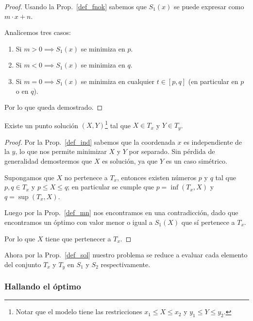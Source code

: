 \begin{proof}
    Usando la Prop.~\ref{def_fnok} sabemos que $S_1(x)$ se puede expresar como $m \cdot x + n$.

    Analicemos tres casos:

    \begin{enumerate}
        \item Si $m > 0 \implies S_1(x)$ se minimiza en $p$.
        \item Si $m < 0 \implies S_1(x)$ se minimiza en $q$.
        \item Si $m = 0 \implies S_1(x)$ se minimiza en cualquier $t \in [p, q]$ (en particular en $p$ o en $q$).
    \end{enumerate}

    Por lo que queda demostrado.
\end{proof}

\newpage
\begin{proposition}
    Existe un punto solución $(X, Y)$\footnote{Notar que el modelo tiene las restricciones $x_1 \le X \le x_2$ y $y_1 \le Y \le y_2$.} tal que $X \in T_x$ y $Y \in T_y$.
    \label{def_sol}
\end{proposition}

\begin{proof}
    \hfill

    Por la Prop.~\ref{def_ind} sabemos que la coordenada $x$ es independiente de la $y$, lo que nos permite minimizar $X$ y $Y$ por separado. Sin pérdida de generalidad demostremos que $X$ es solución, ya que $Y$ es un caso simétrico.
    
    Supongamos que $X$ no pertenece a $T_x$, entonces existen números $p$ y $q$ tal que $p, q \in T_x$ y $p \le X \le q$; en particular se cumple que $p = \inf(T_x, X)$ y $q = \sup(T_x, X)$.
    
    Luego por la Prop.~\ref{def_mn} nos encontramos en una contradicción, dado que encontramos un óptimo con valor menor o igual a $S_1(X)$ que sí pertenece a $T_x$.
    
    Por lo que $X$ tiene que pertenecer a $T_x$.
\end{proof}

Ahora por la Prop.~\ref{def_sol} nuestro problema se reduce a evaluar cada elemento del conjunto $T_x$ y $T_y$ en $S_1$ y $S_2$ respectivamente.

\subsubsection{Hallando el óptimo}

